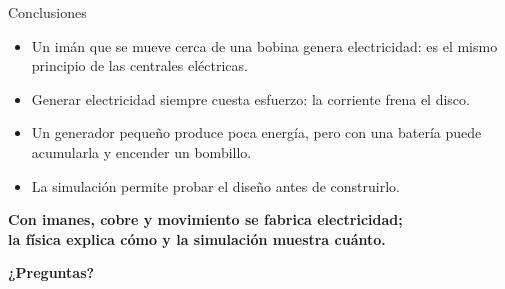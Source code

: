 \documentclass[aspectratio=169,11pt,xcolor={dvipsnames,table}]{beamer}
\begin{document}
\begin{frame}{Conclusiones}
  \begin{itemize}
    \setlength{\itemsep}{4pt}
    \item Un imán que se mueve cerca de una bobina genera electricidad: es el mismo principio de las centrales eléctricas.
    \item Generar electricidad siempre cuesta esfuerzo: la corriente frena el disco.
    \item Un generador pequeño produce poca energía, pero con una batería puede acumularla y encender un bombillo.
    \item La simulación permite probar el diseño antes de construirlo.
  \end{itemize}

  \vspace{0.4cm}
  \begin{tcolorbox}[colback=Azul!6,colframe=Azul,boxrule=0.8pt,arc=3pt,halign=center]
    \large\bfseries\color{Azul}
    Con imanes, cobre y movimiento se fabrica electricidad;\\
    la física explica cómo y la simulación muestra cuánto.
  \end{tcolorbox}

  \vspace{0.2cm}
  \begin{center}
    {\Large\bfseries\color{Azul}¿Preguntas?}
  \end{center}
\end{frame}
\end{document}
